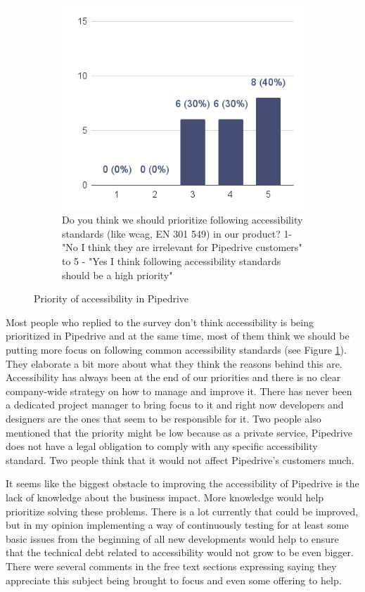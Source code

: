 \documentclass{master_thesis}
\begin{document}
\begin{figure}[H]
\begin{subfigure}{0.45\textwidth}
		\includegraphics[width=\textwidth]{img/a11y-goals.png}
		\caption{Do you think we should prioritize following accessibility standards (like \ac{wcag}, EN 301 549) in our product? 1- "No I think they are irrelevant for Pipedrive customers" to 5 - "Yes I think following accessibility standards should be a high priority" }
	\end{subfigure}
	\caption{Priority of accessibility in Pipedrive}
    \label{fig:a11y-priority}
\end{figure}

Most people who replied to the survey don't think accessibility is being prioritized in Pipedrive and at the same time, most of them think we should be putting more focus on following common accessibility standards (see Figure \ref{fig:a11y-priority}). They elaborate a bit more about what they think the reasons behind this are. Accessibility has always been at the end of our priorities and there is no clear company-wide strategy on how to manage and improve it. There has never been a dedicated project manager to bring focus to it
and right now developers and designers are the ones that seem to be responsible for it. Two people also mentioned that the priority might be low because as a private service, Pipedrive does not have a legal obligation to comply with any specific accessibility standard. Two people think that it would not affect Pipedrive's customers much.

It seems like the biggest obstacle to improving the accessibility of Pipedrive is the lack of knowledge about the business impact. More knowledge would help prioritize solving these problems. There is a lot currently that could be improved, but in my opinion implementing a way of continuously testing for at least some basic issues from the beginning of all new developments would help to ensure that the technical debt related to accessibility would not grow to be even bigger. There were several comments in the free text sections expressing saying they appreciate this subject being brought to focus and even some offering to help.
\end{document}
